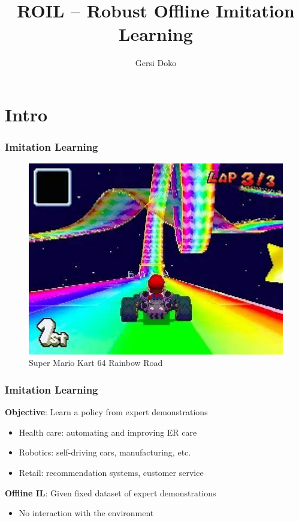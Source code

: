 \documentclass{beamer}
\title{ROIL -- Robust Offline Imitation Learning}
\author{Gersi Doko}
\institute{Department of Computer Science \\ University of New Hampshire}
\date{}
\begin{document}
\frame{\titlepage}

\section*{Intro}

\begin{frame}
	\frametitle{Imitation Learning}
	\centering
	\begin{minipage}{0.9\linewidth}
		\begin{figure}
			\centering
			\includegraphics[width=\linewidth]{plots/rainbow_road.jpeg}
			\caption{Super Mario Kart 64 Rainbow Road}
		\end{figure}
	\end{minipage}
\end{frame}

\begin{frame}
	\frametitle{Imitation Learning}
	\textbf{Objective}: Learn a policy from expert demonstrations
	\begin{itemize}
	\item Health care: automating and improving ER care
	\item Robotics: self-driving cars, manufacturing, etc.
	\item Retail: recommendation systems, customer service
	
	\end{itemize}
	\vfill
	\textbf{Offline IL}: Given fixed dataset of expert demonstrations
	\begin{itemize}
		\item No interaction with the environment
	\end{itemize}
\end{frame}
\end{document}
